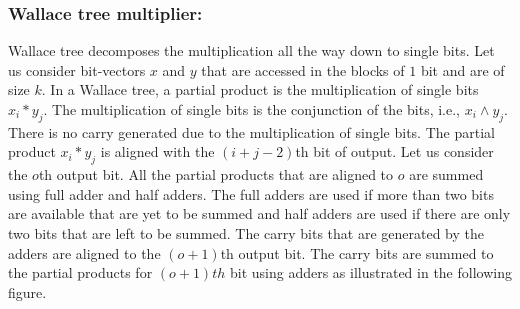 \vspace{-4ex}
\subsubsection{Wallace tree multiplier\cite{wallace}:}
%
Wallace tree decomposes the multiplication all the way down to single bits.
%
Let us consider bit-vectors $x$ and $y$ that are accessed in the blocks of $1$
bit and are of size $k$.
%
In a Wallace tree, a partial product is the multiplication of single
bits $x_i*y_j$.
%
The multiplication of single bits is the conjunction of the bits, i.e.,
$x_i \land y_j$.
%
There is no carry generated due to the multiplication of single bits.
%
The partial product $x_i*y_j$ is aligned with the $(i+j-2)$th bit of output.
%
Let us consider the $o$th output bit.
%
All the partial products that are aligned to $o$ are summed using full adder 
and half adders.
%
The full adders are used
if more than two bits are available that are yet to be summed
and half adders are used if there are only two bits that are left to be summed.
%
The carry bits that are generated by the adders are aligned to the $(o+1)$th output bit.
%
The carry bits are summed to the partial products for $(o+1)th$ bit
using adders as illustrated in the following figure.

\begin{center}
\end{center}

